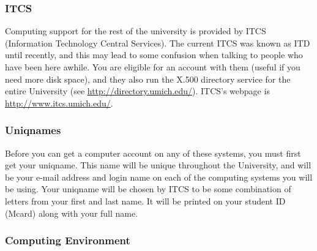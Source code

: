 \documentclass[11pt]{article}
\begin{document}
\subsubsection{ITCS}
\label{sec-7_1_2}

Computing support for the rest of the university is provided by ITCS
(Information Technology Central Services).  The current ITCS was known
as ITD until recently, and this may lead to some confusion when
talking to people who have been here awhile.  You are eligible for an
account with them (useful if you need more disk space), and they also
run the X.500 directory service for the entire University (see
\href{http://directory.umich.edu/}{http://directory.umich.edu/}).  ITCS’s webpage is
\href{http://www.itcs.umich.edu/}{http://www.itcs.umich.edu/}.
\subsubsection{Uniqnames}
\label{sec-7_1_3}

Before you can get a computer account on any of these systems, you
must first get your uniqname. This name will be unique throughout the
University, and will be your e-mail address and login name on each of
the computing systems you will be using.  Your uniqname will be chosen
by ITCS to be some combination of letters from your first and last
name.  It will be printed on your student ID (Mcard) along with your
full name.
\subsubsection{Computing Environment}
\label{sec-7_1_4}
\end{document}
